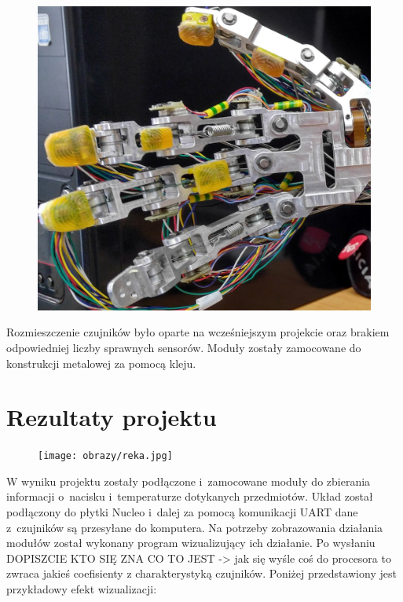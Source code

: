 \documentclass[a4paper,12pt]{article}
\begin{document}
		\begin{figure}[H]
		     	 \includegraphics[width=1\textwidth]{obrazy/dlon.jpg}
			\end{figure}
			
			Rozmieszczenie czujników było oparte na wcześniejszym projekcie oraz brakiem odpowiedniej liczby sprawnych sensorów. Moduły zostały zamocowane do konstrukcji metalowej za pomocą kleju.
		

	\section{Rezultaty projektu}	
	
	\begin{figure}[H]
		     	 \texttt{[image: obrazy/reka.jpg]}
			\end{figure}
	
	W wyniku projektu zostały podłączone i~zamocowane moduły do zbierania informacji o~nacisku i~temperaturze dotykanych przedmiotów. Układ został podłączony do płytki Nucleo i~dalej za pomocą komunikacji UART dane z~czujników są przesyłane do komputera. Na potrzeby zobrazowania działania modułów został wykonany program wizualizujący ich działanie. 
Po wysłaniu DOPISZCIE KTO SIĘ ZNA CO TO JEST -> jak się wyśle coś do procesora to zwraca jakieś coefisienty z charakterystyką czujników.	%
Poniżej przedstawiony jest przykładowy efekt wizualizacji:
	
\end{document}

